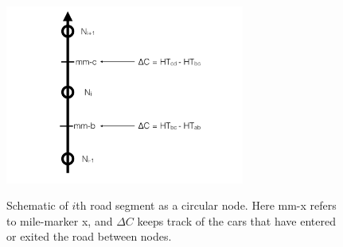 \begin{figure}[h]
\centering
\includegraphics[width=0.7\textwidth]{img/macro-traffic.png}\\
\caption{Schematic of $i$th road segment as a circular node.  Here mm-x refers to mile-marker x, and $\Delta C$ keeps track of the cars that have entered or exited the road between nodes.}
\label{fig:ODE-schematic}
\end{figure}